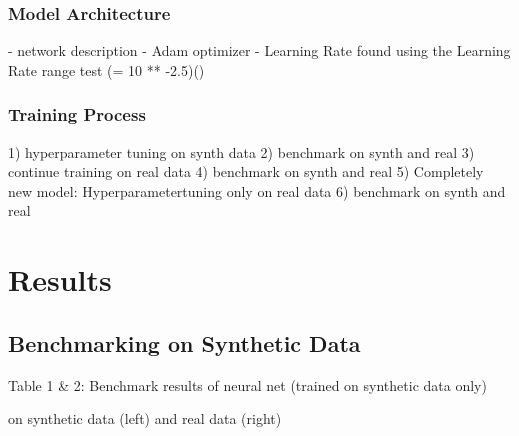 \documentclass[11pt]{article}
\begin{document}
\subsubsection{Model Architecture}
- network description
- Adam optimizer
- Learning Rate found using the Learning Rate range test (= 10 ** -2.5)(\cite{smith2018disciplined})


	
 	

\subsubsection{Training Process}
1) hyperparameter tuning on synth data
2) benchmark on synth and real
3) continue training on real data
4) benchmark on synth and real
5) Completely new model: Hyperparametertuning only on real data
6) benchmark on synth and real

\section{Results}
\subsection{Benchmarking on Synthetic Data}

\begin{center}
	
\qquad

\end{center}
\begin{center}
Table 1 \& 2: Benchmark results of neural net (trained on synthetic data only) 

on synthetic data (left) and real data (right)

\end{center}
\end{document}
